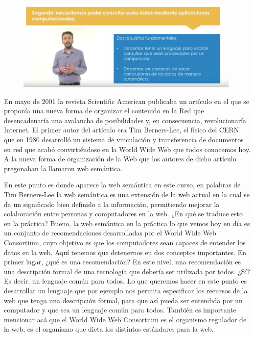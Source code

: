 \begin{figure}[H]
	\centering
	\includegraphics[height=4.5cm]{imagenes/capitulo3/7}
	\caption{}
\end{figure}


En mayo de 2001 la revista Scientific American publicaba un artículo en el que se proponía una nueva forma de organizar el contenido en la Red que desencadenaría una avalancha de posibilidades y, en consecuencia, revolucionaría Internet. El primer autor del artículo era Tim Berners-Lee, el físico del CERN que en 1980 desarrolló un sistema de vinculación y transferencia de documentos en red que acabó convirtiéndose en la World Wide Web que todos conocemos hoy. A la nueva forma de organización de la Web que los autores de dicho artículo pregonaban la llamaron web semántica. %

En este punto es donde aparece la web semántica en este curso, en palabras de Tim Berners-Lee la web semántica es una extensión de la web actual en la cual se da un significado bien definido a la información, permitiendo mejorar la colaboración entre personas y computadores en la web. ¿En qué se traduce esto en la práctica? Bueno, la web semántica en la práctica lo que vemos hoy en día es un conjunto de recomendaciones desarrolladas por el World Wide Web Consortium, cuyo objetivo es que los computadores sean capaces de entender los datos en la web. Aquí tenemos que detenernos en dos conceptos importantes. En primer lugar, ¿qué es una recomendación? En este nivel, una recomendación es una descripción formal de una tecnología que debería ser utilizada por todos. ¿Sí? Es decir, un lenguaje común para todos. Lo que queremos hacer en este punto es desarrollar un lenguaje que por ejemplo nos permita especificar los recursos de la web que tenga una descripción formal, para que así pueda ser entendida por un computador y que sea un lenguaje común para todos. También es importante mencionar acá que el World Wide Web Consortium es el organismo regulador de la web, es el organismo que dicta los distintos estándares para la web.

